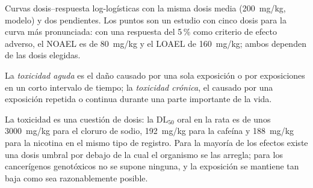 \begin{omfigure}

{\small Curvas dosis--respuesta log-logísticas con la misma dosis media (\qty{200}{mg/kg},
modelo) y dos pendientes. Los puntos son un estudio con cinco dosis para la curva
más pronunciada: con una respuesta del 5\,\% como criterio de efecto adverso, el NOAEL es de
\qty{80}{mg/kg} y el LOAEL de \qty{160}{mg/kg}; ambos dependen de las dosis elegidas.}
\end{omfigure}

\begin{definition}\label{def:b3:environmental-toxicology:toxicity}
La \emph{toxicidad aguda} es el daño causado por una sola
exposición o por exposiciones en un corto intervalo de tiempo; la \emph{toxicidad crónica},
el causado por una exposición repetida o continua durante una parte importante de la vida.
\end{definition}

La toxicidad es una cuestión de dosis: la $\mathrm{DL_{50}}$ oral en la rata es de unos \qty{3000}{mg/kg} para el cloruro de sodio,
\qty{192}{mg/kg} para la cafeína y \qty{188}{mg/kg} para la nicotina en el mismo tipo de registro. Para la mayoría de los efectos existe una
dosis umbral por debajo de la cual el organismo se las arregla; para los cancerígenos genotóxicos
no se supone ninguna, y la exposición se mantiene tan baja como sea razonablemente posible.

